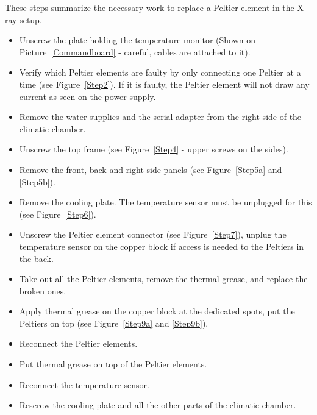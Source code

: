\documentclass[a4paper,12pt,twoside]{article}
\begin{document}
\begin{appendices}
These steps summarize the necessary work to replace a Peltier element in the X-ray setup.
\begin{itemize}
\item Unscrew the plate holding the temperature monitor (Shown on Picture~\ref{Commandboard} - careful, cables are attached to it).
\item Verify which Peltier elements are faulty by only connecting one Peltier at a time (see Figure~\ref{Step2}). If it is faulty, the Peltier element will not draw any current as seen on the power supply.
\item Remove the water supplies and the serial adapter from the right side of the climatic chamber.
\item Unscrew the top frame (see Figure~\ref{Step4} - upper screws on the sides).
\item Remove the front, back and right side panels (see Figure~\ref{Step5a} and \ref{Step5b}).
\item Remove the cooling plate. The temperature sensor must be unplugged for this (see Figure~\ref{Step6}).
\item Unscrew the Peltier element connector (see Figure~\ref{Step7}), unplug the temperature sensor on the copper block if access is needed to the Peltiers in the back.
\item Take out all the Peltier elements, remove the thermal grease, and replace the broken ones.
\item Apply thermal grease on the copper block at the dedicated spots, put the Peltiers on top (see Figure~\ref{Step9a} and \ref{Step9b}).
\item Reconnect the Peltier elements.
\item Put thermal grease on top of the Peltier elements.
\item Reconnect the temperature sensor.
\item Rescrew the cooling plate and all the other parts of the climatic chamber.


\end{itemize}
\end{appendices}
\end{document}
